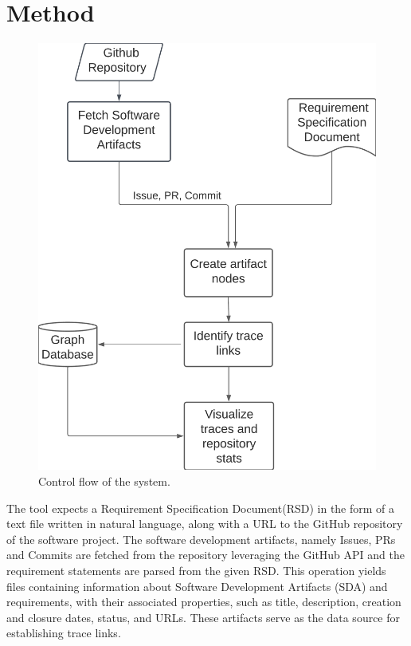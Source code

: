\section{Method}
\label{section:method}

\begin{figure}[htb]
    \centering
    \includegraphics[width=0.45\linewidth]{figs/toolflow.png}
    \caption{Control flow of the system.}
    \label{fig:sys-flow}
\end{figure}

The tool expects a Requirement Specification Document(RSD) in the form of a text file written in natural language, along with a URL to the GitHub repository of the software project. The software development artifacts, namely Issues, PRs and Commits are fetched from the repository leveraging the GitHub API
and the requirement statements are parsed from the given RSD. This operation yields files containing information about Software Development Artifacts (SDA) and requirements, with their associated properties, such as title, description, creation and closure dates, status, and URLs. These artifacts serve as the data source for establishing trace links.

